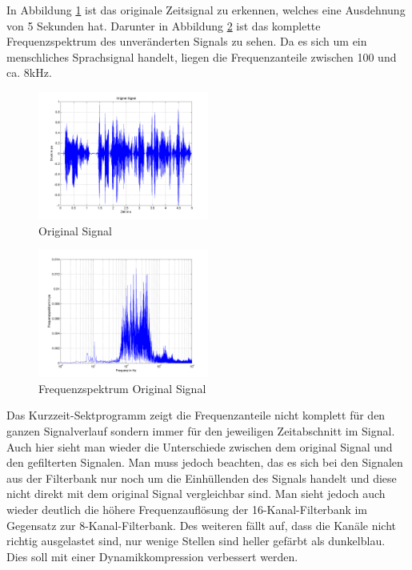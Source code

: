 \documentclass[conference]{IEEEtran}
\begin{document}
\begin{compactenum}[a)]
\newpage
\item In Abbildung \ref{fig:sig_orig} ist das originale Zeitsignal zu erkennen, welches eine Ausdehnung von 5 Sekunden hat. Darunter in Abbildung \ref{fig:freq_orig} ist das komplette Frequenzspektrum des unveränderten Signals zu sehen. Da es sich um ein menschliches Sprachsignal handelt, liegen die Frequenzanteile zwischen 100 und ca. 8kHz. 
\begin{figure}[h!]
	\vspace{-5pt}
	\centering
	\includegraphics[width=0.5\textwidth]{img/sig_orig.png}
	\vspace{-20pt}
	\caption{Original Signal}
	\vspace{-10pt}
	\label{fig:sig_orig}
\end{figure}
\begin{figure}[h!]
	\vspace{-5pt}
	\centering
	\includegraphics[width=0.5\textwidth]{img/freq_orig.png}
	\vspace{-20pt}
	\caption{Frequenzspektrum Original Signal}
	\vspace{-10pt}
	\label{fig:freq_orig}
\end{figure}
Das Kurzzeit-Sektprogramm zeigt die Frequenzanteile nicht komplett für den ganzen Signalverlauf sondern immer für den jeweiligen Zeitabschnitt im Signal. Auch hier sieht man wieder die Unterschiede zwischen dem original Signal und den gefilterten Signalen. Man muss jedoch beachten, das es sich bei den Signalen aus der Filterbank nur noch um die Einhüllenden des Signals handelt und diese nicht direkt mit dem original Signal vergleichbar sind. Man sieht jedoch auch wieder deutlich die höhere Frequenzauflösung der 16-Kanal-Filterbank im Gegensatz zur 8-Kanal-Filterbank. Des weiteren fällt auf, dass die Kanäle nicht richtig ausgelastet sind, nur wenige Stellen sind heller gefärbt als dunkelblau. Dies soll mit einer Dynamikkompression verbessert werden.

\end{compactenum}
\end{document}
